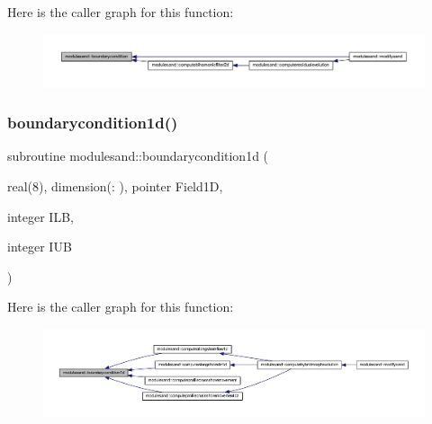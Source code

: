 Here is the caller graph for this function\+:\nopagebreak
\begin{figure}[H]
\begin{center}
\leavevmode
\includegraphics[width=350pt]{namespacemodulesand_a24a6518a059721913dd87b9b1d7f2c4d_icgraph}
\end{center}
\end{figure}
\mbox{\label{namespacemodulesand_ac5edc4e9b694ab004e67e47cc9a22566}} 
\subsubsection{\texorpdfstring{boundarycondition1d()}{boundarycondition1d()}}
{\footnotesize\ttfamily subroutine modulesand\+::boundarycondition1d (\begin{DoxyParamCaption}\item[{real(8), dimension(\+:  ), pointer}]{Field1D,  }\item[{integer}]{I\+LB,  }\item[{integer}]{I\+UB }\end{DoxyParamCaption})\hspace{0.3cm}{\ttfamily [private]}}

Here is the caller graph for this function\+:\nopagebreak
\begin{figure}[H]
\begin{center}
\leavevmode
\includegraphics[width=350pt]{namespacemodulesand_ac5edc4e9b694ab004e67e47cc9a22566_icgraph}
\end{center}
\end{figure}
\mbox{\label{namespacemodulesand_a608f78fe34da2344f75a4b2f32487eae}} 
